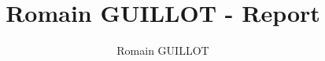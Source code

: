\documentclass[12pt]{report}
\begin{document}
\titlespacing*{\chapter}{0pt}{-50pt}{40pt}




\title{Romain GUILLOT - Report}
\author{Romain GUILLOT}








\renewcommand{\baselinestretch}{0}\normalsize
{
  \hypersetup{linkcolor=black}
  \tableofcontents

  \listoffigures
}
\renewcommand{\baselinestretch}{1.0}\normalsize

\titlespacing*{\chapter}{0pt}{-70pt}{40pt}







% 


\nocite{*}






\end{document}
